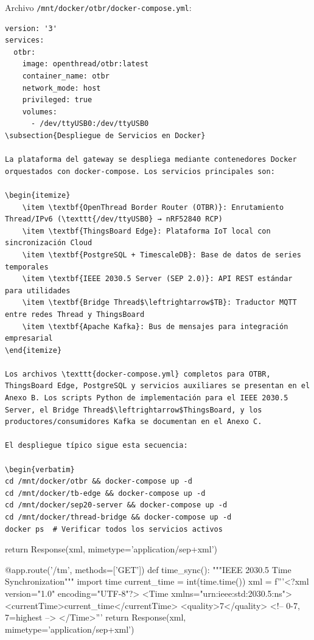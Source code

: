 Archivo \texttt{/mnt/docker/otbr/docker-compose.yml}:
\begin{verbatim}
version: '3'
services:
  otbr:
    image: openthread/otbr:latest
    container_name: otbr
    network_mode: host
    privileged: true
    volumes:
      - /dev/ttyUSB0:/dev/ttyUSB0
\subsection{Despliegue de Servicios en Docker}

La plataforma del gateway se despliega mediante contenedores Docker orquestados con docker-compose. Los servicios principales son:

\begin{itemize}
    \item \textbf{OpenThread Border Router (OTBR)}: Enrutamiento Thread/IPv6 (\texttt{/dev/ttyUSB0} → nRF52840 RCP)
    \item \textbf{ThingsBoard Edge}: Plataforma IoT local con sincronización Cloud
    \item \textbf{PostgreSQL + TimescaleDB}: Base de datos de series temporales
    \item \textbf{IEEE 2030.5 Server (SEP 2.0)}: API REST estándar para utilidades
    \item \textbf{Bridge Thread$\leftrightarrow$TB}: Traductor MQTT entre redes Thread y ThingsBoard
    \item \textbf{Apache Kafka}: Bus de mensajes para integración empresarial
\end{itemize}

Los archivos \texttt{docker-compose.yml} completos para OTBR, ThingsBoard Edge, PostgreSQL y servicios auxiliares se presentan en el Anexo B. Los scripts Python de implementación para el IEEE 2030.5 Server, el Bridge Thread$\leftrightarrow$ThingsBoard, y los productores/consumidores Kafka se documentan en el Anexo C.

El despliegue típico sigue esta secuencia:

\begin{verbatim}
cd /mnt/docker/otbr && docker-compose up -d
cd /mnt/docker/tb-edge && docker-compose up -d
cd /mnt/docker/sep20-server && docker-compose up -d
cd /mnt/docker/thread-bridge && docker-compose up -d
docker ps  # Verificar todos los servicios activos
\end{verbatim}
    return Response(xml, mimetype='application/sep+xml')

@app.route('/tm', methods=['GET'])
def time_sync():
    """IEEE 2030.5 Time Synchronization"""
    import time
    current_time = int(time.time())
    xml = f'''<?xml version="1.0" encoding="UTF-8"?>
    <Time xmlns="urn:ieee:std:2030.5:ns">
      <currentTime>{current_time}</currentTime>
      <quality>7</quality>  <!-- 0-7, 7=highest -->
    </Time>'''
    return Response(xml, mimetype='application/sep+xml')

